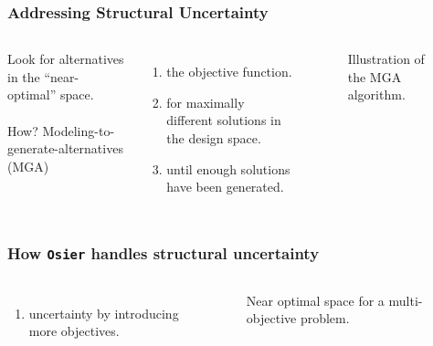 \begin{frame}
    \frametitle{Addressing Structural Uncertainty}

    \begin{columns}
        \column[t]{4cm}
         Look for alternatives in the ``near-optimal'' space.\\~\\

        How? Modeling-to-generate-alternatives (MGA)
        \begin{enumerate}
            \item {} the objective function.
            \item {} for maximally different solutions in the design space.
            \item {} until enough solutions have been generated.
        \end{enumerate}
    
        \column[t]{6cm}
        \begin{figure}
            \centering
            \resizebox{\columnwidth}{!}{}
            \caption{Illustration of the MGA algorithm.}
            \label{fig:standard-mga}
        \end{figure}
    \end{columns}

\end{frame}


\begin{frame}
    \frametitle{How \texttt{Osier} handles structural uncertainty}

    \begin{columns}
        \column[t]{4cm}
        \begin{enumerate}
            \item {} uncertainty by introducing more objectives.
        \end{enumerate}
        \column[t]{6cm}
        \begin{figure}
            \centering
            \resizebox{\columnwidth}{!}{}
            \caption{Near optimal space for a multi-objective problem.}
            \label{fig:near-opt}
        \end{figure}
    \end{columns}

\end{frame}

